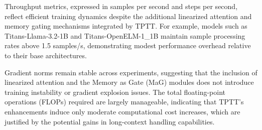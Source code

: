 \documentclass[10pt,a4paper]{article}
\begin{document}
\begin{table}[h!]
    \centering
    \caption{Training performance of Titans-based models with TPTT.}
    \label{tab:training-metrics}
\end{table}

Throughput metrics, expressed in samples per second and steps per second, reflect efficient training dynamics despite the additional linearized attention and memory gating mechanisms integrated by TPTT. For example, models such as Titans-Llama-3.2-1B and Titans-OpenELM-1\_1B maintain sample processing rates above 1.5 samples/s, demonstrating modest performance overhead relative to their base architectures.

Gradient norms remain stable across experiments, suggesting that the inclusion of linearized attention and the Memory as Gate (MaG) modules does not introduce training instability or gradient explosion issues. The total floating-point operations (FLOPs) required are largely manageable, indicating that TPTT’s enhancements induce only moderate computational cost increases, which are justified by the potential gains in long-context handling capabilities.
\end{document}
